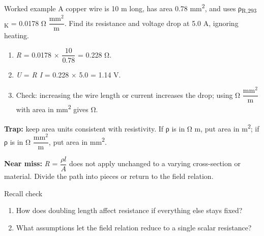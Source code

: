\documentclass[11pt]{article}
\begin{document}
\begin{keepsection}
\begin{workedbox}{Worked example}
A copper wire is 10 m long, has area 0.78 mm\textsuperscript{2}, and uses ρ\textsubscript{R,293 K} = 0.0178 Ω {\small\ensuremath{\dfrac{\text{mm}^{2}}{\mathrm{m}}}}. Find its resistance and voltage drop at 5.0 A, ignoring heating.

\begin{enumerate}
\item \textit{R} = 0.0178 \ensuremath{\times} {\small\ensuremath{\dfrac{10}{0.78}}} = 0.228 Ω.
\item \textit{U} = \textit{R I} = 0.228 \ensuremath{\times} 5.0 = 1.14 V.
\item Check: increasing the wire length or current increases the drop; using Ω {\small\ensuremath{\dfrac{\text{mm}^{2}}{\mathrm{m}}}} with area in mm\textsuperscript{2} gives Ω.
\end{enumerate}
\end{workedbox}

\begin{notebox}\textbf{Trap:} keep area units consistent with resistivity. If ρ is in Ω m, put area in m\textsuperscript{2}; if ρ is in Ω {\small\ensuremath{\dfrac{\text{mm}^{2}}{\mathrm{m}}}}, put area in mm\textsuperscript{2}.\end{notebox}

\begin{notebox}\textbf{Near miss:} \textit{R} = {\small\ensuremath{\dfrac{ρ{l}}{{A}}}} does not apply unchanged to a varying cross-section or material. Divide the path into pieces or return to the field relation.\end{notebox}

\begin{recallbox}{Recall check}
\begin{enumerate}
\item How does doubling length affect resistance if everything else stays fixed?
\item What assumptions let the field relation reduce to a single scalar resistance?
\end{enumerate}

\end{recallbox}
\end{keepsection}
\end{document}
